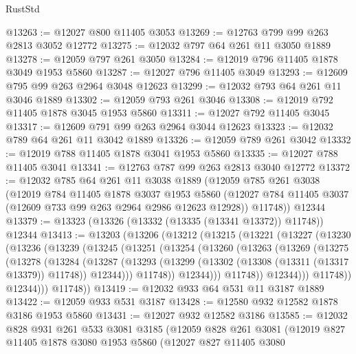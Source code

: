 \begin{lexlean}{RustStd}
\begin{coremodule}
@13263 := @12027 @800 @11405 @3053
@13269 := @12763 @799 @99 @263 @2813 @3052 @12772
@13275 := @12032 @797 @64 @261 @11 @3050 @1889
@13278 := @12059 @797 @261 @3050
@13284 := @12019 @796 @11405 @1878 @3049 @1953 @5860
@13287 := @12027 @796 @11405 @3049
@13293 := @12609 @795 @99 @263 @2964 @3048 @12623
@13299 := @12032 @793 @64 @261 @11 @3046 @1889
@13302 := @12059 @793 @261 @3046
@13308 := @12019 @792 @11405 @1878 @3045 @1953 @5860
@13311 := @12027 @792 @11405 @3045
@13317 := @12609 @791 @99 @263 @2964 @3044 @12623
@13323 := @12032 @789 @64 @261 @11 @3042 @1889
@13326 := @12059 @789 @261 @3042
@13332 := @12019 @788 @11405 @1878 @3041 @1953 @5860
@13335 := @12027 @788 @11405 @3041
@13341 := @12763 @787 @99 @263 @2813 @3040 @12772
@13372 := @12032
    @785
    @64
    @261
    @11
    @3038
    @1889
    (@12059
      @785
      @261
      @3038
      (@12019
        @784
        @11405
        @1878
        @3037
        @1953
        @5860
        (@12027 @784 @11405 @3037 (@12609 @733 @99 @263 @2964 @2986 @12623 @12928))
        @11748))
    @12344
@13379 := @13323 (@13326 (@13332 (@13335 (@13341 @13372)) @11748)) @12344
@13413 := @13203
    (@13206
      (@13212
        (@13215
          (@13221
            (@13227
              (@13230
                (@13236
                  (@13239
                    (@13245
                      (@13251
                        (@13254
                          (@13260
                            (@13263
                              (@13269
                                (@13275
                                  (@13278
                                    (@13284
                                      (@13287
                                        (@13293
                                          (@13299
                                            (@13302 (@13308 (@13311 (@13317 @13379)) @11748))
                                            @12344)))
                                      @11748))
                                  @12344)))
                            @11748))
                        @12344)))
                  @11748))
              @12344)))
        @11748))
@13419 := @12032 @933 @64 @531 @11 @3187 @1889
@13422 := @12059 @933 @531 @3187
@13428 := @12580 @932 @12582 @1878 @3186 @1953 @5860
@13431 := @12027 @932 @12582 @3186
@13585 := @12032
    @828
    @931
    @261
    @533
    @3081
    @3185
    (@12059
      @828
      @261
      @3081
      (@12019
        @827
        @11405
        @1878
        @3080
        @1953
        @5860
        (@12027
          @827
          @11405
          @3080

\end{coremodule}
\end{lexlean}
